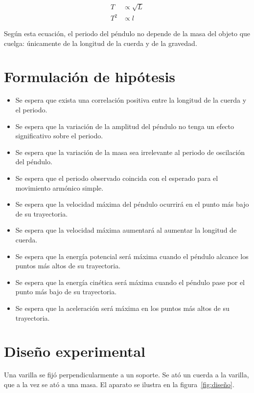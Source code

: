 \documentclass[letterpaper]{report}
\numberwithin{table}{section}
\begin{document}
\begin{align}
  T &\propto \sqrt{L} \\
  T^{2} &\propto l
  \label{eq:periodo_proporcionalidad}
\end{align}

Según esta ecuación, el periodo del péndulo no depende de la masa del objeto que
cuelga: únicamente de la longitud de la cuerda y de la gravedad.

\section{Formulación de hipótesis}

\begin{itemize}
  \item Se espera que exista una correlación positiva entre la longitud
    de la cuerda y el periodo.
  \item Se espera que la variación de la amplitud del péndulo no tenga un
    efecto significativo sobre el periodo.
  \item Se espera que la variación de la masa sea irrelevante al periodo
    de oscilación del péndulo.
  \item Se espera que el periodo observado coincida con el
    esperado para el movimiento armónico simple.
  \item Se espera que la velocidad máxima del péndulo ocurrirá
    en el punto más bajo de su trayectoria.
  \item Se espera que la velocidad máxima aumentará al aumentar
    la longitud de cuerda.
  \item Se espera que la energía potencial será máxima cuando el
    péndulo alcance los puntos más altos de su trayectoria.
  \item Se espera que la energía cinética será máxima cuando el
    péndulo pase por el punto más bajo de su trayectoria.
  \item Se espera que la aceleración será máxima en los puntos
    más altos de su trayectoria.
\end{itemize}

\section{Diseño experimental}

Una varilla se fijó perpendicularmente a un soporte. Se ató un cuerda a
la varilla, que a la vez se ató a una masa. El aparato se ilustra en la
figura~\ref{fig:diseño}.
\end{document}
